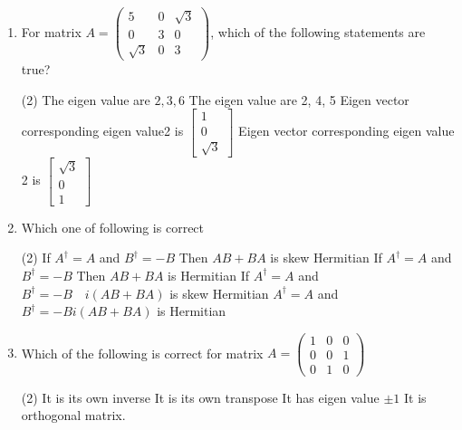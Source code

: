 \begin{enumerate}
\begin{tasks}
                	\task[\textbf{d.}] The eigen vector corresponding to nondegenerate eigen value is $\left[\begin{array}{l}1 \\ 1 \\ 0\end{array}\right]$
                \end{tasks}
  \item For matrix $A=\left(\begin{array}{ccc}5 & 0 & \sqrt{3} \\ 0 & 3 & 0 \\ \sqrt{3} & 0 & 3\end{array}\right)$, which of the following statements are true?
  \begin{tasks}(2)
 	\task[\textbf{a.}]The eigen value are $2,3,6$
 	\task[\textbf{b.}]The eigen value are 2, 4, 5
 	\task[\textbf{c.}]Eigen vector corresponding eigen value2 is $\left[\begin{array}{c}1 \\ 0 \\ \sqrt{3}\end{array}\right]$
 	\task[\textbf{d.}] Eigen vector corresponding eigen value 2 is $\left[\begin{array}{c}\sqrt{3} \\ 0 \\ 1\end{array}\right]$
 \end{tasks}               
 \item  Which one of following is correct 
   \begin{tasks}(2)
  	\task[\textbf{a.}] If $A^{\dagger}=A$ and $B^{\dagger}=-B$ Then $A B+B A$ is skew Hermitian
  	\task[\textbf{b.}] If $A^{\dagger}=A$ and $B^{\dagger}=-B$ Then $A B+B A$ is Hermitian
  	\task[\textbf{c.}]If $A^{\dagger}=A$ and $B^{\dagger}=-B \quad i(A B+B A)$ is skew Hermitian
  	\task[\textbf{d.}] $A^{\dagger}=A$ and $B^{\dagger}=-B i(A B+B A)$ is Hermitian    
  \end{tasks}              
\item  Which of the following is correct for matrix $A=\left(\begin{array}{lll}1 & 0 & 0 \\ 0 & 0 & 1 \\ 0 & 1 & 0\end{array}\right)$             
   \begin{tasks}(2)
  	\task[\textbf{a.}] It is its own inverse
  	\task[\textbf{b.}]It is its own transpose
  	\task[\textbf{c.}] It has eigen value $\pm 1$
  	\task[\textbf{d.}]  It is orthogonal matrix.
  \end{tasks}              

\end{enumerate}
